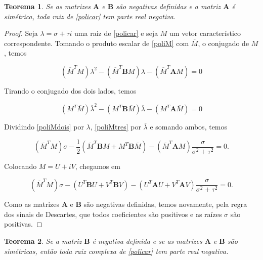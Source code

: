 \documentclass[
	12pt,				%
	openright,			%
	twoside,			%
	a4paper,			%
	english,			%
	french,				%
	spanish,			%
	brazil				%
	]{abntex2}
\newtheorem{teorema}{Teorema}[chapter]
\newcommand{\B}{\boldsymbol{B}}
\newcommand{\A}{\boldsymbol{A}}
\newcommand{\Mbarra}{\overline{M}}
\begin{document}
\begin{teorema} \label{teor2}
	Se as matrizes $\A$ e $\B$ são negativas definidas e a matriz $\A$ é simétrica,
	toda raiz de \ref{policar} tem parte real negativa.
\end{teorema}

\begin{proof}

	Seja $\lambda = \sigma + \tau i$ uma raiz de \ref{policar} e seja $M$ um vetor
	característico correspondente. Tomando o produto escalar de \ref{poliM} com
	$\Mbarra$, o conjugado de $M$, temos

	\begin{equation} \label{poliMdois}
		(\Mbarra^T M)\lambda^2 - (\Mbarra^T \B M)\lambda - (\Mbarra^T \A M) = 0
	\end{equation}

	Tirando o conjugado dos dois lados, temos

	\begin{equation} \label{poliMtres}
		(M^T \Mbarra) \overline{\lambda}^2 - (M^T \B \Mbarra) \overline{\lambda} - (M^T \A \Mbarra) = 0
	\end{equation}

	Dividindo \ref{poliMdois} por $\lambda$, \ref{poliMtres} por $\overline{\lambda}$ e somando ambos, temos

	\begin{equation}
		(\Mbarra^T M)\sigma - \frac{1}{2}(\Mbarra^T \B M + M^T \B \Mbarra) - (\Mbarra^T \A M) \frac{\sigma}{\sigma^2 + \tau^2} = 0.
	\end{equation}

	Colocando $M = U + iV$, chegamos em

	\begin{equation}
		(\Mbarra^T M)\sigma - (U^T \B U + V^T \B V) - (U^T \A U + V^T \A V) \frac{\sigma}{\sigma^2 + \tau^2} = 0.
	\end{equation}

	Como as matrizes $\A$ e $\B$ são negativas definidas, temos novamente, pela regra
	dos sinais de Descartes, que todos coeficientes são positivos e as raízes $\sigma$
	são positivas.

\end{proof}

\begin{teorema}
	Se a matriz $\B$ é negativa definida e se as matrizes $\A$ e $\B$ são simétricas,
	então toda raiz complexa de \ref{policar} tem parte real negativa.
\end{teorema}
\end{document}
